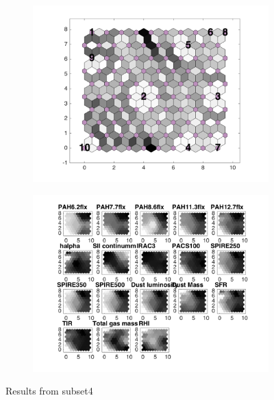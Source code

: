 \begin{figure}
    \begin{subfigure}[b]{0.5\textwidth}
        \centering
        \includegraphics[width=\textwidth]{../../images0.01/M31/2D/image_subsets/subset4_dist_with_hits_t.png}
        \label{fig: subset4_dist}
    \end{subfigure}
    \hfill
    \begin{subfigure}[b]{0.5\textwidth}
        \includegraphics[width=\textwidth]{../../images0.01/M31/2D/image_subsets/weight_planes_subset4.png}
        \label{fig: subset4_plane}
    \end{subfigure}
    \caption{Results from subset4}
    \label{fig: subset4}
\end{figure}